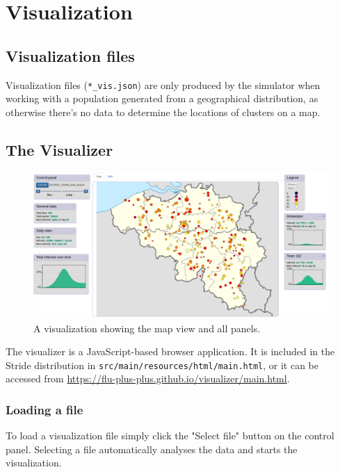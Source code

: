 \chapter{Visualization}
\label{chap:visualizer}


\section{Visualization files}

Visualization files (\texttt{*\_vis.json}) are only produced by the simulator when working with a population generated from a geographical distribution, as otherwise there's no data to determine the locations of clusters on a map.

\section{The Visualizer}

\begin{figure}[t]
	\centering
	\includegraphics[width=\textwidth]{images/visualizer.png}
	\caption{A visualization showing the map view and all panels.}
\end{figure}

The visualizer is a JavaScript-based browser application. It is included in the Stride distribution in \texttt{src/main/resources/html/main.html}, or it can be accessed from \url{https://flu-plus-plus.github.io/visualizer/main.html}.


\subsection{Loading a file}

To load a visualization file simply click the "Select file" button on the control panel. Selecting a file automatically analyses the data and starts the visualization.

